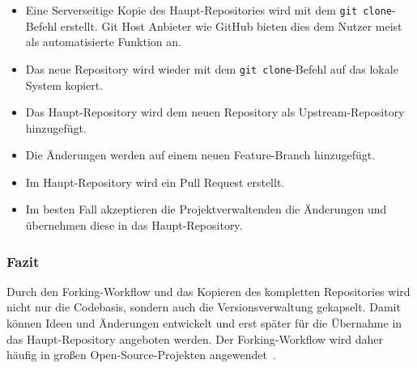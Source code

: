 \begin{itemize}
    \item Eine Serverseitige Kopie des Haupt\hyp Repositories wird mit dem \texttt{git clone}-Befehl erstellt. Git Host Anbieter wie GitHub bieten dies dem Nutzer meist als automatisierte Funktion an.
    
    \item Das neue Repository wird wieder mit dem \texttt{git clone}-Befehl auf das lokale System kopiert.
    
    \item Das Haupt\hyp Repository wird dem neuen Repository als Upstream\hyp Repository hinzugefügt.
    
    \item Die Änderungen werden auf einem neuen Feature\hyp Branch hinzugefügt.
    
    \item Im Haupt\hyp Repository wird ein Pull Request erstellt.
    
    \item Im besten Fall akzeptieren die Projektverwaltenden die Änderungen und übernehmen diese in das Haupt\hyp Repository.
\end{itemize}


\subsubsection{Fazit}

Durch den Forking\hyp Workflow und das Kopieren des kompletten Repositories wird nicht nur die Codebasis, sondern auch die Versionsverwaltung gekapselt. Damit können Ideen und Änderungen entwickelt und erst später für die Übernahme in das Haupt\hyp Repository angeboten werden. Der Forking\hyp Workflow wird daher häufig in großen Open\hyp Source\hyp Projekten angewendet~\cite{github_inc_contributing_2023}.
